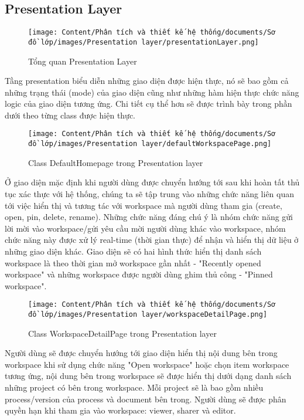 \subsection{Presentation Layer}
\begin{figure}[H]
    \centering
    \texttt{[image: Content/Phân tích và thiết kế hệ thống/documents/Sơ đồ lớp/images/Presentation layer/presentationLayer.png]}
    \vspace{0.5cm}
    \caption{Tổng quan Presentation Layer}
    \label{fig:Tổng quan Presentation layer}
\end{figure}
Tầng presentation biểu diễn những giao diện được hiện thực, nó sẽ bao gồm cả những trạng thái (mode) của giao diện cũng như những hàm hiện thực chức năng logic của giao diện tương ứng.
Chi tiết cụ thể hơn sẽ được trình bày trong phần dưới theo từng class được hiện thực.

\begin{figure}[H]
    \centering
    \texttt{[image: Content/Phân tích và thiết kế hệ thống/documents/Sơ đồ lớp/images/Presentation layer/defaultWorkspacePage.png]}
    \vspace{0.5cm}
    \caption{Class DefaultHomepage trong Presentation layer}
    \label{fig:Class Default homepage trong Presentation layer}
\end{figure}
Ở giao diện mặc định khi người dùng được chuyển hướng tới sau khi hoàn tất thủ tục xác thực với hệ thống, chúng ta sẽ tập trung vào những chức năng liên quan tới việc hiển thị và tương tác với workspace mà người dùng tham gia (create, open, pin, delete, rename). Những chức năng đáng chú ý là nhóm chức năng gửi lời mời vào workspace/gửi yêu cầu mời người dùng khác vào workspace, nhóm chức năng này được xử lý real-time (thời gian thực) để nhận và hiển thị dữ liệu ở những giao diện khác. Giao diện sẽ có hai hình thức hiển thị danh sách workspace là theo thời gian mở workspace gần nhất - "Recently opened workspace" và những workspace được người dùng ghim thủ công - "Pinned workspace".

\begin{figure}[H]
    \centering
    \texttt{[image: Content/Phân tích và thiết kế hệ thống/documents/Sơ đồ lớp/images/Presentation layer/workspaceDetailPage.png]}
    \vspace{0.5cm}
    \caption{Class WorkspaceDetailPage trong Presentation layer}
    \label{fig:Class WorkspaceDetailPage trong Presentation layer}
\end{figure}
Người dùng sẽ được chuyển hướng tới giao diện hiển thị nội dung bên trong workspace khi sử dụng chức năng "Open workspace" hoặc chọn item workspace tương ứng, nội dung bên trong workspace sẽ được hiển thị dưới dạng danh sách những project có bên trong workspace. Mỗi project sẽ là bao gồm nhiều process/version của process và document bên trong. Người dùng sẽ được phân quyền hạn khi tham gia vào workspace: viewer, sharer và editor.

